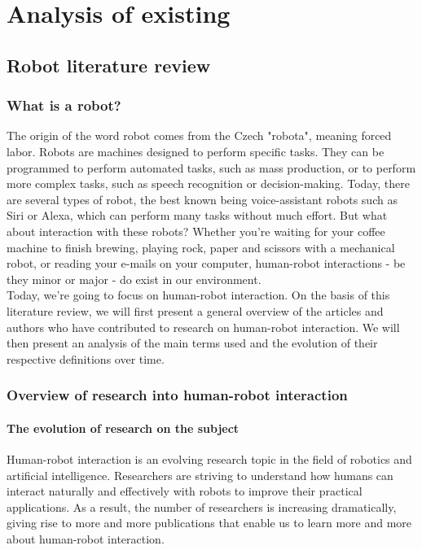 \chapter{Analysis of existing}
\section{Robot literature review}
\subsection{What is a robot?}
The origin of the word robot comes from the Czech "robota", meaning forced labor. Robots are machines designed to perform specific tasks. They can be programmed to perform automated tasks, such as mass production, or to perform more complex tasks, such as speech recognition or decision-making. Today, there are several types of robot, the best known being voice-assistant robots such as Siri or Alexa, which can perform many tasks without much effort. But what about interaction with these robots? Whether you're waiting for your coffee machine to finish brewing, playing rock, paper and scissors with a mechanical robot, or reading your e-mails on your computer, human-robot interactions - be they minor or major - do exist in our environment.\\
Today, we're going to focus on human-robot interaction.
On the basis of this literature review, we will first present a general overview of the articles and authors who have contributed to research on human-robot interaction. We will then present an analysis of the main terms used and the evolution of their respective definitions over time.\\

\subsection{Overview of research into human-robot interaction}
\subsubsection{The evolution of research on the subject}
Human-robot interaction is an evolving research topic in the field of robotics and artificial intelligence. Researchers are striving to understand how humans can interact naturally and effectively with robots to improve their practical applications. As a result, the number of researchers is increasing dramatically, giving rise to more and more publications that enable us to learn more and more about human-robot interaction.\\
